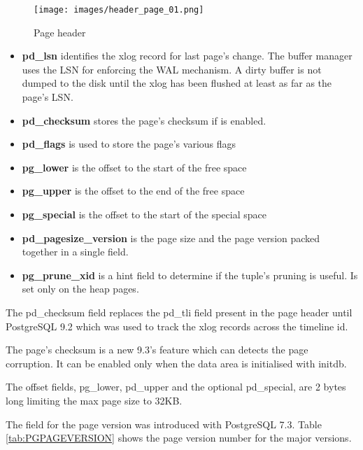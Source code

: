 \begin{figure}[H]
\begin{center}

\texttt{[image: images/header\_page\_01.png]}

\caption{Page header}
\label{fig:HEADERPAG01}
\end{center}

\end{figure}
\begin{itemize}
 \item \textbf{pd\_lsn} identifies the xlog record for last page's change.  The
buffer manager uses the  LSN for enforcing the WAL mechanism. A dirty buffer is not
dumped to the disk until the xlog has been flushed at least as far as the page's LSN.
\item \textbf{pd\_checksum} stores the page's checksum if is enabled.
\item \textbf{pd\_flags} is used to store the page's various flags
\item \textbf{pg\_lower} is the offset to the start of the free space
\item \textbf{pg\_upper} is the offset to the end of the free space
\item \textbf{pg\_special} is the offset to the start of the special space
\item \textbf{pd\_pagesize\_version} is the page size and the page version packed
together in a single field.
\item \textbf{pg\_prune\_xid} is a hint field to determine if the tuple's pruning is
useful. Is set only on the heap pages.

\end{itemize}

The pd\_checksum field replaces the pd\_tli field present in the page
header until PostgreSQL 9.2 which was used to track the xlog records across the timeline id.
\newline

The page's checksum is a new 9.3's feature which can detects the page corruption. It can be enabled only
when the data area is initialised with initdb.\newline

The offset fields, pg\_lower, pd\_upper and the optional pd\_special, are 2 bytes long limiting the
max page size to 32KB.\newline

The field for the page version was introduced with PostgreSQL 7.3.
Table \ref{tab:PGPAGEVERSION} shows the page version number for the major versions.

